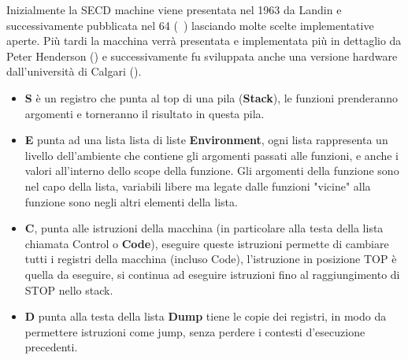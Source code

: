 \documentclass{article}
\begin{document}
Inizialmente la SECD machine viene presentata nel 1963 da Landin e successivamente pubblicata nel 64 (~\cite{LandinPJ}) lasciando molte scelte implementative aperte. Più tardi la macchina verrà presentata e implementata più in dettaglio da Peter Henderson (\cite{Henderson}) e successivamente fu sviluppata anche una versione hardware dall'università di Calgari (\cite{DesIsu}).

\begin{itemize}
	\item \textbf{S} è un registro che punta al top di una pila (\textbf{Stack}), le funzioni prenderanno argomenti e torneranno il risultato in questa pila.
	\item \textbf{E} punta ad una lista lista di liste \textbf{Environment}, ogni lista rappresenta un livello dell'ambiente che contiene gli argomenti passati alle funzioni, e anche i valori all'interno dello scope della funzione.
	Gli argomenti della funzione sono nel capo della lista, variabili libere ma legate dalle funzioni "vicine" alla funzione sono negli altri elementi della lista.
	\item \textbf{C}, punta alle istruzioni della macchina (in particolare alla testa della lista chiamata Control o \textbf{Code}), eseguire queste istruzioni permette di cambiare tutti i registri della macchina (incluso Code), l'istruzione in posizione TOP è quella da eseguire, si continua ad eseguire istruzioni fino al raggiungimento di STOP nello stack.
	\item \textbf{D} punta alla testa della lista \textbf{Dump} tiene le copie dei registri, in modo da permettere istruzioni come jump, senza perdere i contesti d'esecuzione precedenti.
\end{itemize}
\end{document}
